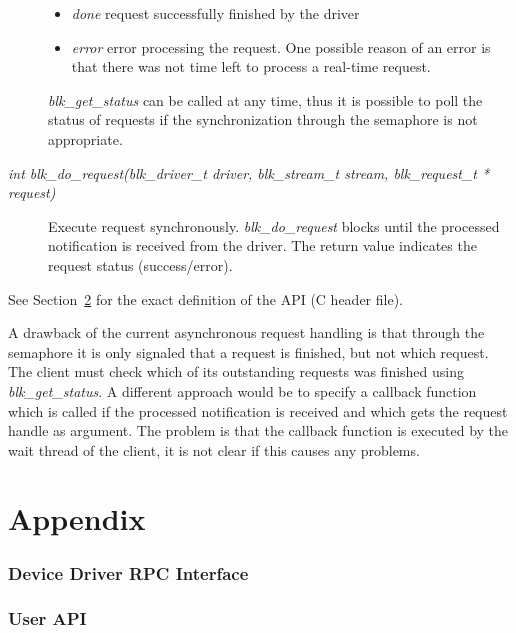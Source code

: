 \documentclass{article}
\begin{document}
\begin{description}
\begin{itemize}
  \item \emph{done} request successfully finished by the driver
  \item \emph{error} error processing the request. One possible reason of an 
    error is that there was not time left to process a real-time request.
  \end{itemize}
  \emph{blk\_get\_status} can be called at any time, thus it is possible
  to poll the status of requests if the synchronization through the 
  semaphore is not appropriate.
\item[\emph{int blk\_do\_request(blk\_driver\_t driver, blk\_stream\_t stream,
    blk\_request\_t * request)}]
  Execute request synchronously. \emph{blk\_do\_request} blocks until the
  processed notification is received from the driver. The return value 
  indicates the request status (success/error). 
\end{description}
See Section~\ref{app:api} for the exact definition of the API (C header file).

A drawback of the current asynchronous request handling is that through the 
semaphore it is only signaled that a request is finished, but not which 
request. The client must check which of its outstanding requests was finished
using \emph{blk\_get\_status}. A different approach would be to specify a 
callback function which is called if the processed notification is received and
which gets the request handle as argument. The problem is that the callback
function is executed by the wait thread of the client, it is not clear if this
causes any problems.

\clearpage
\part{Appendix}

\section{Device Driver RPC Interface}
\label{app:rpc}

\section{User API}
\label{app:api}
\end{document}
